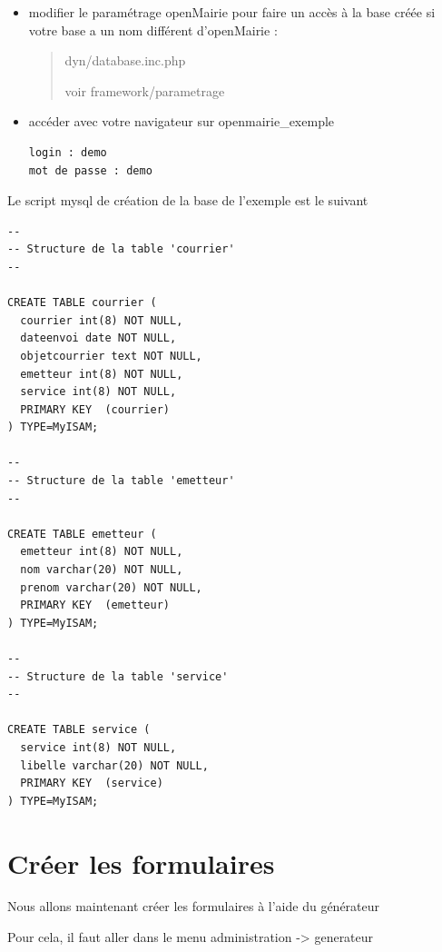 \documentclass[letterpaper,10pt,french]{manual}
\begin{document}
\begin{itemize}
\begin{itemize}
\end{itemize}

\item {} 
modifier le paramétrage openMairie pour faire un accès à la base créée si votre base a un nom différent d'openMairie :
\begin{quote}

dyn/database.inc.php

voir framework/parametrage
\end{quote}

\item {} 
accéder avec votre navigateur sur openmairie\_exemple

\begin{Verbatim}[commandchars=@\[\]]
login : demo
mot de passe : demo
\end{Verbatim}

\end{itemize}

Le script mysql de création de la base de l'exemple est le suivant

\begin{Verbatim}[commandchars=@\[\]]
--
-- Structure de la table 'courrier'
--

CREATE TABLE courrier (
  courrier int(8) NOT NULL,
  dateenvoi date NOT NULL,
  objetcourrier text NOT NULL,
  emetteur int(8) NOT NULL,
  service int(8) NOT NULL,
  PRIMARY KEY  (courrier)
) TYPE=MyISAM;

--
-- Structure de la table 'emetteur'
--

CREATE TABLE emetteur (
  emetteur int(8) NOT NULL,
  nom varchar(20) NOT NULL,
  prenom varchar(20) NOT NULL,
  PRIMARY KEY  (emetteur)
) TYPE=MyISAM;

--
-- Structure de la table 'service'
--

CREATE TABLE service (
  service int(8) NOT NULL,
  libelle varchar(20) NOT NULL,
  PRIMARY KEY  (service)
) TYPE=MyISAM;
\end{Verbatim}

\resetcurrentobjects
\hypertarget{--doc-utilisation/utiliser_generateur}{}

\hypertarget{utiliser-generateur}{}\section{Créer les formulaires}

Nous allons maintenant créer les formulaires à l'aide du générateur

Pour cela, il faut aller dans le menu administration -\textgreater{} generateur
\end{document}
